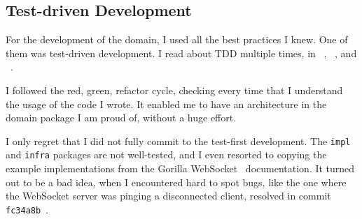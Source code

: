 \subsection{Test-driven Development}\label{sec:test-driven-development}

For the development of the domain,
I used all the best practices I knew.
One of them was test-driven development.
I read about TDD multiple times, in
~\cite{beck_test-driven_2002},
~\cite{martin_clean_2011}, and
~\cite{beck_extreme_2004}.

I followed the red, green, refactor cycle,
checking every time that I understand
the usage of the code I wrote.
It enabled me to have an architecture
in the domain package I am proud of,
without a huge effort.

I only regret that
I did not fully commit to the test-first development.
The \texttt{impl} and \texttt{infra} packages
are not well-tested,
and I even resorted to copying the example implementations
from the Gorilla WebSocket~\cite{burd_gorilla_2022} documentation.
It turned out to be a bad idea,
when I encountered hard to spot bugs,
like the one
where the WebSocket server
was pinging a disconnected client,
resolved in commit \texttt{fc34a8b}~.

